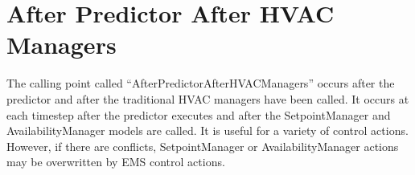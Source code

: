 \section{After Predictor After HVAC Managers}\label{after-predictor-after-hvac-managers}

The calling point called ``AfterPredictorAfterHVACManagers'' occurs after the predictor and after the traditional HVAC managers have been called. It occurs at each timestep after the predictor executes and after the SetpointManager and AvailabilityManager models are called. It is useful for a variety of control actions. However, if there are conflicts, SetpointManager or AvailabilityManager actions may be overwritten by EMS control actions.

